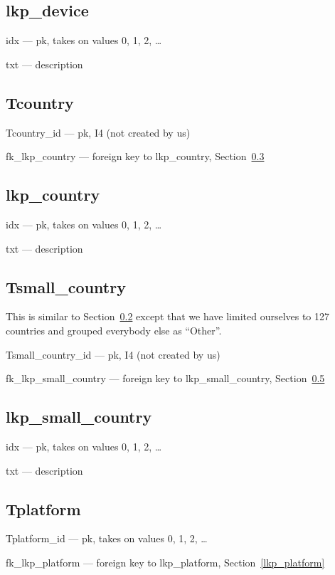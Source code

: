 \subsection{lkp\_device}
\label{lkp_device}
\be
\item idx --- pk, takes on values 0, 1, 2, \ldots
\item txt --- description
\ee
\subsection{Tcountry}
\label{Tcountry}
\be
\item Tcountry\_id --- pk, I4 (not created by us)
\item fk\_lkp\_country --- foreign key to lkp\_country, 
Section~\ref{lkp_country}
\ee

\subsection{lkp\_country}
\label{lkp_country}
\be
\item idx --- pk, takes on values 0, 1, 2, \ldots
\item txt --- description
\ee
\subsection{Tsmall\_country}
\label{Tsmall_country}
This is similar to Section~\ref{Tcountry} except that we have limited
ourselves to 127 countries and grouped everybody else as ``Other''.
\be
\item Tsmall\_country\_id --- pk, I4 (not created by us)
\item fk\_lkp\_small\_country --- foreign key to lkp\_small\_country, 
Section~\ref{lkp_small_country}
\ee

\subsection{lkp\_small\_country}
\label{lkp_small_country}
\be
\item idx --- pk, takes on values 0, 1, 2, \ldots
\item txt --- description
\ee
\subsection{Tplatform}
\be
\item Tplatform\_id --- pk, takes on values 0, 1, 2, \ldots
\item fk\_lkp\_platform --- foreign key to lkp\_platform,
Section~\ref{lkp_platform}
\ee

